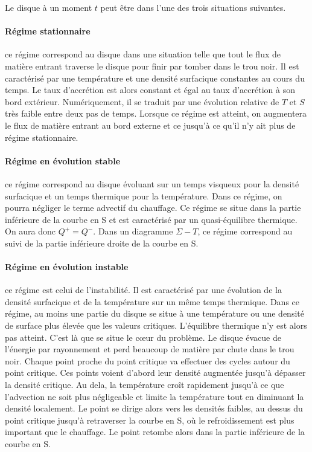 Le disque à un moment $t$ peut être dans l'une des trois situations suivantes.

\paragraph{Régime stationnaire} ce régime correspond au disque dans une situation telle que tout le flux de matière entrant traverse le disque pour finir par tomber dans le trou noir. Il est caractérisé par une température et une densité surfacique constantes au cours du temps. Le taux d'accrétion est alors constant et égal au taux d'accrétion à son bord extérieur. Numériquement, il se traduit par une évolution relative de $T$ et $S$ très faible entre deux pas de temps. Lorsque ce régime est atteint, on augmentera le flux de matière entrant au bord externe et ce jusqu'à ce qu'il n'y ait plus de régime stationnaire.

\paragraph{Régime en évolution stable} ce régime correspond au disque évoluant sur un temps visqueux pour la densité surfacique et un temps thermique pour la température. Dans ce régime, on pourra négliger le terme advectif du chauffage. Ce régime se situe dans la partie inférieure de la courbe en S et est caractérisé par un quasi-équilibre thermique. On aura donc $Q^+ = Q^-$. Dans un diagramme $\Sigma-T$, ce régime correspond au suivi de la partie inférieure droite de la courbe en S.
\paragraph{Régime en évolution instable} ce régime est celui de l'instabilité. Il est caractérisé par une évolution de la densité surfacique et de la température sur un même temps thermique. Dans ce régime, au moins une partie du disque se situe à une température ou une densité de surface plus élevée que les valeurs critiques. L'équilibre thermique n'y est alors pas atteint. C'est là que se situe le cœur du problème. Le disque évacue de l'énergie par rayonnement et perd beaucoup de matière par chute dans le trou noir. Chaque point proche du point critique va effectuer des cycles autour du point critique. Ces points voient d'abord leur densité augmentée jusqu'à dépasser la densité critique. Au dela, la température croît rapidement jusqu'à ce que l'advection ne soit plus négligeable et limite la température tout en diminuant la densité localement. Le point se dirige alors vers les densités faibles, au dessus du point critique jusqu'à retraverser la courbe en S, où le refroidissement est plus important que le chauffage. Le point retombe alors dans la partie inférieure de la courbe en S.

